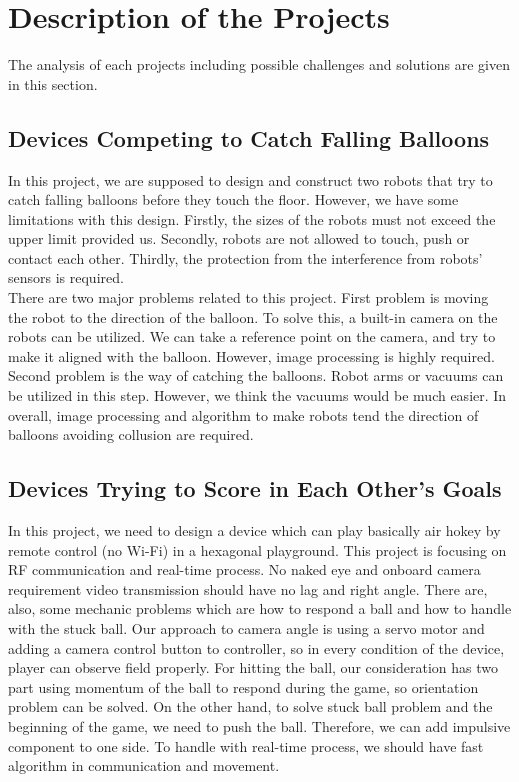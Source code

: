 \documentclass[a4paper,12pt]{article}
\begin{document}

\section{Description of the Projects}
The analysis of each projects including possible challenges and solutions are given in this section.

\subsection{Devices Competing to Catch Falling Balloons}

In this project, we are supposed to design and construct two robots that try to catch falling balloons before they touch the floor. However, we have some limitations with this design. Firstly, the sizes of the robots must not exceed the upper limit provided us. Secondly, robots are not allowed to touch, push or contact each other. Thirdly, the protection from the interference from robots’ sensors is required.\\

There are two major problems related to this project. First problem is moving the robot to the direction of the balloon. To solve this, a built-in camera on the robots can be utilized. We can take a reference point on the camera, and try to make it aligned with the balloon. However, image processing is highly required. Second problem is the way of catching the balloons. Robot arms or vacuums can be utilized in this step. However, we think the vacuums would be much easier. In overall, image processing and algorithm to make robots tend the direction of balloons avoiding collusion are required.

\subsection{Devices Trying to Score in Each Other’s Goals}
In this project, we need to design a device which can play basically air hokey by remote control (no Wi-Fi) in a hexagonal playground. This project is focusing on RF communication and real-time process. No naked eye and onboard camera requirement video transmission should have no lag and right angle. There are, also, some mechanic problems which are how to respond a ball and how to handle with the stuck ball. Our approach to camera angle is using a servo motor and adding a camera control button to controller, so in every condition of the device, player can observe field properly. For hitting the ball, our consideration has two part using momentum of the ball to respond during the game, so orientation problem can be solved. On the other hand, to solve stuck ball problem and the beginning of the game, we need to push the ball. Therefore, we can add impulsive component to one side. To handle with real-time process, we should have fast algorithm in communication and movement. 
\end{document}
